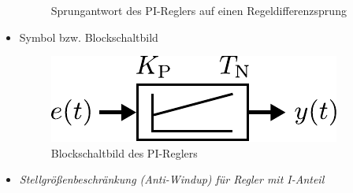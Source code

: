 \begin{itemize}
\begin{figure}[h]
		\caption{Sprungantwort des PI-Reglers auf einen Regeldifferenzsprung}
	\end{figure}
	\item Symbol bzw. Blockschaltbild
	\begin{figure}[h]
		\centering
		\includegraphics[width=0.3\linewidth]{Abbildungen/Reglerentwurf/PDF/PIReglerBlock.pdf}
		\caption{Blockschaltbild des PI-Reglers}
	\end{figure}
\end{itemize}
%
\begin{Aufgaben}{}{}
	\begin{itemize}
		\item \textit{Stellgrößenbeschränkung (Anti-Windup) für Regler mit I-Anteil}
	\end{itemize}
\end{Aufgaben}
%
